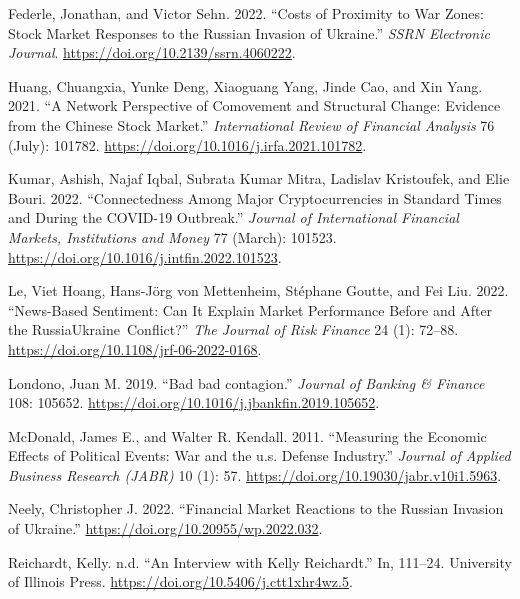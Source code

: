 \documentclass[
  letterpaper,
  DIV=11,
  numbers=noendperiod]{scrartcl}
\newlength{\cslhangindent}
\newlength{\cslentryspacingunit} %
\newenvironment{CSLReferences}[2] %
 {%
  \setlength{\parindent}{0pt}
  \ifodd #1
  \let\oldpar\par
  \def\par{\hangindent=\cslhangindent\oldpar}
  \fi
  \setlength{\parskip}{#2\cslentryspacingunit}
 }%
 {}
\begin{document}
\begin{CSLReferences}{1}{0}
\leavevmode{}%
Federle, Jonathan, and Victor Sehn. 2022. {``Costs of Proximity to War
Zones: Stock Market Responses to the Russian Invasion of Ukraine.''}
\emph{SSRN Electronic Journal}.
\url{https://doi.org/10.2139/ssrn.4060222}.

\leavevmode{}%
Huang, Chuangxia, Yunke Deng, Xiaoguang Yang, Jinde Cao, and Xin Yang.
2021. {``A Network Perspective of Comovement and Structural Change:
Evidence from the Chinese Stock Market.''} \emph{International Review of
Financial Analysis} 76 (July): 101782.
\url{https://doi.org/10.1016/j.irfa.2021.101782}.

\leavevmode{}%
Kumar, Ashish, Najaf Iqbal, Subrata Kumar Mitra, Ladislav Kristoufek,
and Elie Bouri. 2022. {``Connectedness Among Major Cryptocurrencies in
Standard Times and During the COVID-19 Outbreak.''} \emph{Journal of
International Financial Markets, Institutions and Money} 77 (March):
101523. \url{https://doi.org/10.1016/j.intfin.2022.101523}.

\leavevmode{}%
Le, Viet Hoang, Hans-Jörg von Mettenheim, Stéphane Goutte, and Fei Liu.
2022. {``News-Based Sentiment: Can It Explain Market Performance Before
and After the Russia{\textendash}Ukraine~Conflict?''} \emph{The Journal
of Risk Finance} 24 (1): 72--88.
\url{https://doi.org/10.1108/jrf-06-2022-0168}.

\leavevmode{}%
Londono, Juan M. 2019. {``{Bad bad contagion}.''} \emph{Journal of
Banking \& Finance} 108: 105652.
\url{https://doi.org/10.1016/j.jbankfin.2019.105652}.

\leavevmode{}%
McDonald, James E., and Walter R. Kendall. 2011. {``Measuring the
Economic Effects of Political Events: War and the u.s. Defense
Industry.''} \emph{Journal of Applied Business Research (JABR)} 10 (1):
57. \url{https://doi.org/10.19030/jabr.v10i1.5963}.

\leavevmode{}%
Neely, Christopher J. 2022. {``Financial Market Reactions to the Russian
Invasion of Ukraine.''} \url{https://doi.org/10.20955/wp.2022.032}.

\leavevmode{}%
Reichardt, Kelly. n.d. {``An Interview with Kelly Reichardt.''} In,
111--24. University of Illinois Press.
\url{https://doi.org/10.5406/j.ctt1xhr4wz.5}.


\end{CSLReferences}
\end{document}
